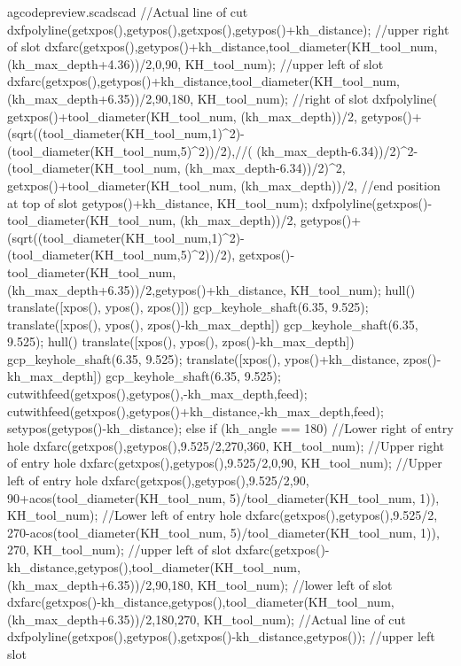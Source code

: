 \documentclass{ltxdoc}
\begin{document}
\begin{writecode}{a}{gcodepreview.scad}{scad}
{    //Actual line of cut
    dxfpolyline(getxpos(),getypos(),getxpos(),getypos()+kh_distance);
    //upper right of slot
    dxfarc(getxpos(),getypos()+kh_distance,tool_diameter(KH_tool_num, (kh_max_depth+4.36))/2,0,90, KH_tool_num);
    //upper left of slot
    dxfarc(getxpos(),getypos()+kh_distance,tool_diameter(KH_tool_num, (kh_max_depth+6.35))/2,90,180, KH_tool_num);
    //right of slot
    dxfpolyline(
        getxpos()+tool_diameter(KH_tool_num, (kh_max_depth))/2, 
        getypos()+(sqrt((tool_diameter(KH_tool_num,1)^2)-(tool_diameter(KH_tool_num,5)^2))/2),//( (kh_max_depth-6.34))/2)^2-(tool_diameter(KH_tool_num, (kh_max_depth-6.34))/2)^2,
        getxpos()+tool_diameter(KH_tool_num, (kh_max_depth))/2,
    //end position at top of slot
        getypos()+kh_distance, 
        KH_tool_num);
    dxfpolyline(getxpos()-tool_diameter(KH_tool_num, (kh_max_depth))/2, getypos()+(sqrt((tool_diameter(KH_tool_num,1)^2)-(tool_diameter(KH_tool_num,5)^2))/2), getxpos()-tool_diameter(KH_tool_num, (kh_max_depth+6.35))/2,getypos()+kh_distance, KH_tool_num);
    hull(){
      translate([xpos(), ypos(), zpos()]){
        gcp_keyhole_shaft(6.35, 9.525);
      }
      translate([xpos(), ypos(), zpos()-kh_max_depth]){
        gcp_keyhole_shaft(6.35, 9.525);
      }
    }
    hull(){
      translate([xpos(), ypos(), zpos()-kh_max_depth]){
        gcp_keyhole_shaft(6.35, 9.525);
      }
      translate([xpos(), ypos()+kh_distance, zpos()-kh_max_depth]){
        gcp_keyhole_shaft(6.35, 9.525);
      }
    }
    cutwithfeed(getxpos(),getypos(),-kh_max_depth,feed);
    cutwithfeed(getxpos(),getypos()+kh_distance,-kh_max_depth,feed);
    setypos(getypos()-kh_distance);
  } else if (kh_angle == 180) {
    //Lower right of entry hole
    dxfarc(getxpos(),getypos(),9.525/2,270,360, KH_tool_num);
    //Upper right of entry hole
    dxfarc(getxpos(),getypos(),9.525/2,0,90, KH_tool_num);
    //Upper left of entry hole
    dxfarc(getxpos(),getypos(),9.525/2,90, 90+acos(tool_diameter(KH_tool_num, 5)/tool_diameter(KH_tool_num, 1)), KH_tool_num);
    //Lower left of entry hole
    dxfarc(getxpos(),getypos(),9.525/2, 270-acos(tool_diameter(KH_tool_num, 5)/tool_diameter(KH_tool_num, 1)), 270, KH_tool_num);
    //upper left of slot
    dxfarc(getxpos()-kh_distance,getypos(),tool_diameter(KH_tool_num, (kh_max_depth+6.35))/2,90,180, KH_tool_num);
    //lower left of slot
    dxfarc(getxpos()-kh_distance,getypos(),tool_diameter(KH_tool_num, (kh_max_depth+6.35))/2,180,270, KH_tool_num);
    //Actual line of cut
    dxfpolyline(getxpos(),getypos(),getxpos()-kh_distance,getypos());
    //upper left slot
}
\end{writecode}
\end{document}

